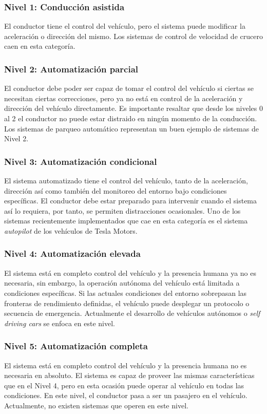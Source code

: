         \subsubsection{Nivel 1: Conducción asistida}
        El conductor tiene el control del vehículo, pero el sistema puede modificar la aceleración o dirección del mismo. Los 
        sistemas de control de velocidad de crucero caen en esta categoría.
        \subsubsection{Nivel 2: Automatización parcial}
        El conductor debe poder ser capaz de tomar el control del vehículo si ciertas se necesitan ciertas correcciones, pero  
        ya no está en control de la aceleración y dirección del vehículo directamente. Es importante resaltar que desde los
        niveles 0 al 2 el conductor no puede estar distraido en ningún momento de la conducción. Los sistemas de parqueo 
        automático representan un buen ejemplo de sistemas de Nivel 2.
        \subsubsection{Nivel 3: Automatización condicional}
        El sistema automatizado tiene el control del vehículo, tanto de la aceleración, dirección así como también del monitoreo 
        del entorno bajo condiciones específicas. El conductor debe estar preparado para intervenir cuando el sistema así lo 
        requiera, por tanto, se permiten distracciones ocasionales. Uno de los sistemas recientemente implementados que cae en esta 
        categoría es el sistema \textit{autopilot} de los vehículos de Tesla Motors. %
        \subsubsection{Nivel 4: Automatización elevada}
        El sistema está en completo control del vehículo y la presencia humana ya no es necesaria, sin embargo, la operación autónoma 
        del vehículo está limitada a condiciones específicas. Si las actuales condiciones del entorno sobrepasan las fronteras 
        de rendimiento definidas, el vehículo puede desplegar un protocolo o secuencia de emergencia. Actualmente el desarrollo 
        de vehículos autónomos o \textit{self driving cars} se enfoca en este nivel. 
        \subsubsection{Nivel 5: Automatización completa}
        El sistema está en completo control del vehículo y la presencia humana no es necesaria en absoluto. El sistema es capaz 
        de proveer las mismas características que en el Nivel 4, pero en esta ocasión puede operar al vehículo en todas las condiciones.
        En este nivel, el conductor pasa a ser un pasajero en el vehículo. Actualmente, no existen sistemas que operen en este nivel.

